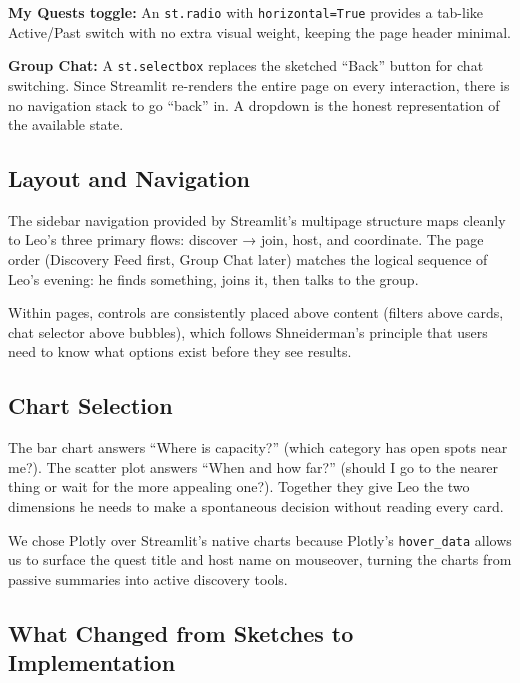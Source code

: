 \documentclass[11pt]{article}
\begin{document}
\textbf{My Quests toggle:} An \texttt{st.radio} with \texttt{horizontal=True} provides a tab-like Active/Past switch with no extra visual weight, keeping the page header minimal.

\textbf{Group Chat:} A \texttt{st.selectbox} replaces the sketched ``Back'' button for chat switching. Since Streamlit re-renders the entire page on every interaction, there is no navigation stack to go ``back'' in. A dropdown is the honest representation of the available state.

\subsection{Layout and Navigation}

The sidebar navigation provided by Streamlit's multipage structure maps cleanly to Leo's three primary flows: discover → join, host, and coordinate. The page order (Discovery Feed first, Group Chat later) matches the logical sequence of Leo's evening: he finds something, joins it, then talks to the group.

Within pages, controls are consistently placed above content (filters above cards, chat selector above bubbles), which follows Shneiderman's principle that users need to know what options exist before they see results.

\subsection{Chart Selection}

The bar chart answers ``Where is capacity?'' (which category has open spots near me?). The scatter plot answers ``When and how far?'' (should I go to the nearer thing or wait for the more appealing one?). Together they give Leo the two dimensions he needs to make a spontaneous decision without reading every card.

We chose Plotly over Streamlit's native charts because Plotly's \texttt{hover\_data} allows us to surface the quest title and host name on mouseover, turning the charts from passive summaries into active discovery tools.

\subsection{What Changed from Sketches to Implementation}
\end{document}
